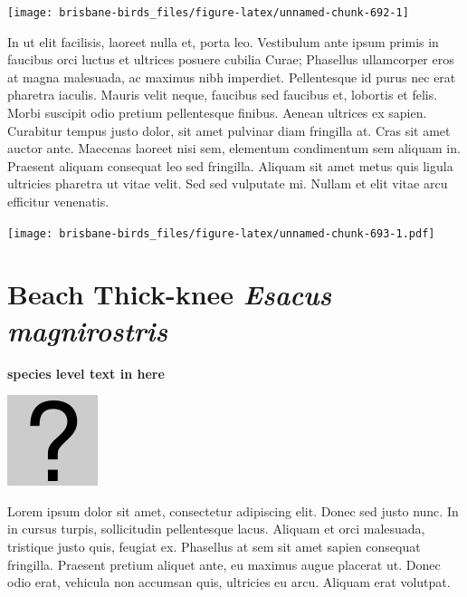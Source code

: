 \documentclass[]{book}
\let\origfigure\figure
\let\endorigfigure\endfigure
\renewenvironment{figure}[1][2] {
  \expandafter\origfigure\expandafter[H]
} {
  \endorigfigure
}
\begin{document}
\begin{figure}
\texttt{[image: brisbane-birds\_files/figure-latex/unnamed-chunk-692-1]} \caption{insert figure caption}\label{fig:unnamed-chunk-692}
\end{figure}

In ut elit facilisis, laoreet nulla et, porta leo. Vestibulum ante ipsum
primis in faucibus orci luctus et ultrices posuere cubilia Curae;
Phasellus ullamcorper eros at magna malesuada, ac maximus nibh
imperdiet. Pellentesque id purus nec erat pharetra iaculis. Mauris velit
neque, faucibus sed faucibus et, lobortis et felis. Morbi suscipit odio
pretium pellentesque finibus. Aenean ultrices ex sapien. Curabitur
tempus justo dolor, sit amet pulvinar diam fringilla at. Cras sit amet
auctor ante. Maecenas laoreet nisi sem, elementum condimentum sem
aliquam in. Praesent aliquam consequat leo sed fringilla. Aliquam sit
amet metus quis ligula ultricies pharetra ut vitae velit. Sed sed
vulputate mi. Nullam et elit vitae arcu efficitur venenatis.

\begin{figure}
\centering
\texttt{[image: brisbane-birds\_files/figure-latex/unnamed-chunk-693-1.pdf]}
\caption{\label{fig:unnamed-chunk-693}insert figure caption}
\end{figure}

\section{\texorpdfstring{Beach Thick-knee \emph{Esacus
magnirostris}}{Beach Thick-knee Esacus magnirostris}}\label{beach-thick-knee-esacus-magnirostris}

\textbf{species level text in here}

\begin{figure}
\centering
\includegraphics{assets/missing.png}
\caption{No image for species}
\end{figure}

Lorem ipsum dolor sit amet, consectetur adipiscing elit. Donec sed justo
nunc. In in cursus turpis, sollicitudin pellentesque lacus. Aliquam et
orci malesuada, tristique justo quis, feugiat ex. Phasellus at sem sit
amet sapien consequat fringilla. Praesent pretium aliquet ante, eu
maximus augue placerat ut. Donec odio erat, vehicula non accumsan quis,
ultricies eu arcu. Aliquam erat volutpat.
\end{document}
